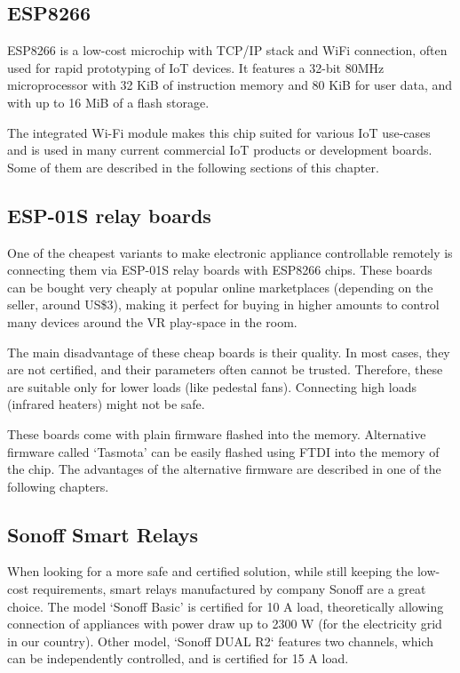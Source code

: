 \subsection{ESP8266}

ESP8266 is a low-cost microchip with TCP/IP stack and WiFi connection, 
often used for rapid prototyping of IoT devices. It features
a 32-bit 80MHz microprocessor with 32 KiB of instruction memory and 80 KiB for
user data, and with up to 16 MiB of a flash storage. \cite{espspecs}

The integrated Wi-Fi module makes this chip suited for various IoT use-cases 
and is used in many current commercial IoT products or development boards.
Some of them are described in the following sections of this chapter.

\hypertarget{x-esp-01s-relay-boards}{\subsection{ESP-01S relay boards}}
One of the cheapest variants to make electronic appliance controllable
remotely is connecting them via ESP-01S relay boards with ESP8266 chips.
These boards can be bought very cheaply at popular online marketplaces
(depending on the seller, around US\$3), making it perfect for buying in
higher amounts to control many devices around the VR play-space in the room.

The main disadvantage of these cheap boards is their quality. In most cases,
they are not certified, and their parameters often cannot be trusted. Therefore,
these are suitable only for lower loads (like pedestal fans). Connecting high
loads (infrared heaters) might not be safe.


These boards come with plain firmware flashed into the memory. Alternative
firmware called `Tasmota' can be easily flashed using FTDI into the memory
of the chip. The advantages of the alternative firmware are described
in one of the following chapters.


\hypertarget{x-sonoff-smart-relays}{\subsection{Sonoff Smart Relays}}
When looking for a more safe and certified solution, while still keeping the
low-cost requirements, smart relays manufactured by company Sonoff
are a great choice. The model `Sonoff Basic' is certified for 10 A load,
theoretically allowing connection of appliances with power draw up to 2300 W (for the
electricity grid in our country). Other model, `Sonoff DUAL R2` features
two channels, which can be independently controlled, and is certified for 15 A
load.


